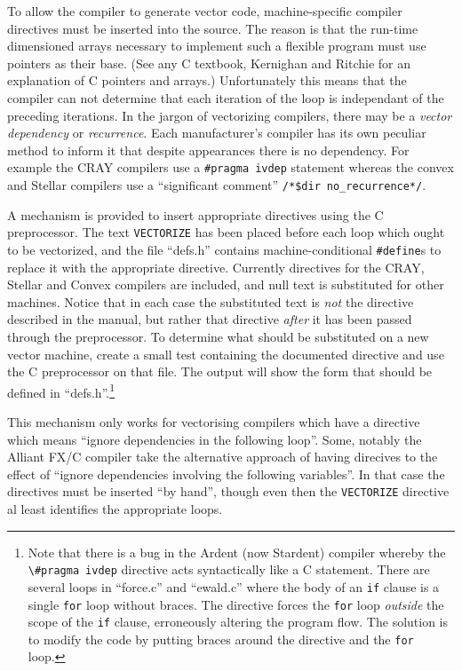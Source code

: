 To  allow  the compiler  to  generate   vector code,  machine-specific
compiler  directives must be inserted  into the  source. The reason is
that the  run-time  dimensioned arrays necessary   to implement such a
flexible  program   must use   pointers as  their  base.    (See any C
textbook, \eg    Kernighan  and  Ritchie\cite{kernighan:78}    for  an
explanation of C pointers  and arrays.)  Unfortunately this means that
the  compiler  can not determine  that each iteration  of  the loop is
independant of the preceding iterations.  In the jargon of vectorizing
compilers, there may be a {\em vector dependency} or {\em recurrence}.
Each manufacturer's compiler has its own  peculiar method to inform it
that despite appearances there is no dependency.  For example the CRAY
compilers use  a  \verb'#pragma'~\verb'ivdep'   statement  whereas the
convex and Stellar compilers use a ``significant comment''
\verb'/*$dir'~\verb'no_recurrence*/'.


A mechanism is provided to insert appropriate directives using the C
preprocessor.  The text \verb'VECTORIZE' has been placed before each
loop which ought to be vectorized, and the file ``defs.h'' contains
machine-conditional \verb'#define's to replace it with the appropriate
directive.  Currently directives for the CRAY, Stellar and Convex
compilers are included, and null text is substituted for other
machines.  Notice that in each case the substituted text is {\em not}
the directive described in the manual, but rather that directive {\em
after} it has been passed through the preprocessor. To determine what
should be substituted on a new vector machine, create a small test
containing the documented directive and use the C preprocessor on that
file. The output will show the form that should be defined in
``defs.h''.\footnote{Note that there is a bug in the Ardent (now
Stardent) compiler whereby the \verb'\#pragma'~\verb'ivdep' directive acts
syntactically like a C statement.  There are several loops in
``force.c'' and ``ewald.c'' where the body of an \verb'if' clause is a
single \verb'for' loop without braces.  The directive forces the
\verb'for' loop {\em outside} the scope of the \verb'if' clause,
erroneously altering the program flow.  The solution is to modify the
code by putting braces around the directive and the \verb'for' loop.}

This mechanism only works for vectorising compilers which have a
directive which means ``ignore dependencies in the following loop''.
Some, notably the Alliant FX/C compiler take the alternative approach
of having direcives to the effect of ``ignore dependencies involving
the following variables''.  In that case the directives must be
inserted ``by hand'', though even then the \verb'VECTORIZE' directive
al least identifies the appropriate loops.

